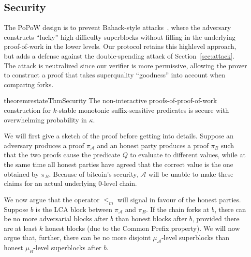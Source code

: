 \subsection{Security}

The PoPoW design is to prevent Bahack-style
attacks~\cite{bahack}, where the adversary constructs ``lucky'' high-difficulty
superblocks without filling in the underlying proof-of-work in the lower
levels.
Our protocol retains this highlevel approach, but adds a defense against the double-spending attack of Section~\ref{sec:attack}.
The attack is neutralized since our
verifier is more permissive, allowing the prover to construct a proof that takes superquality  ``goodness'' into account when comparing forks.


\begin{restatable}{theorem}{restateThmSecurity}
    \label{thm.security}
    The non-interactive proofs-of-proof-of-work construction for $k$-stable
    monotonic suffix-sensitive predicates is secure with overwhelming
    probability in $\kappa$.
\end{restatable}

We will first give a sketch of the proof before getting into 
details. Suppose an adversary produces a proof $\pi_\mathcal{A}$ and an honest
party produces a proof $\pi_B$ such that the two proofs cause the predicate $Q$
to evaluate to different values, while at the same time all honest parties have
agreed that the correct value is the one obtained by $\pi_B$. Because of
bitcoin's security, $\mathcal{A}$ will be unable to make these claims for an
actual underlying 0-level chain.

We now argue that the operator $\leq_m$ will
signal in favour of the honest parties.
Suppose $b$ is the LCA block between $\pi_\mathcal{A}$ and $\pi_B$. If the chain
forks at $b$, there can be no more adversarial blocks after $b$ than honest
blocks after $b$, provided there are at least $k$ honest blocks (due to the
Common Prefix property). We will now argue that, further, there can be no more
disjoint $\mu_\mathcal{A}$-level superblocks than honest $\mu_B$-level
superblocks after $b$.

